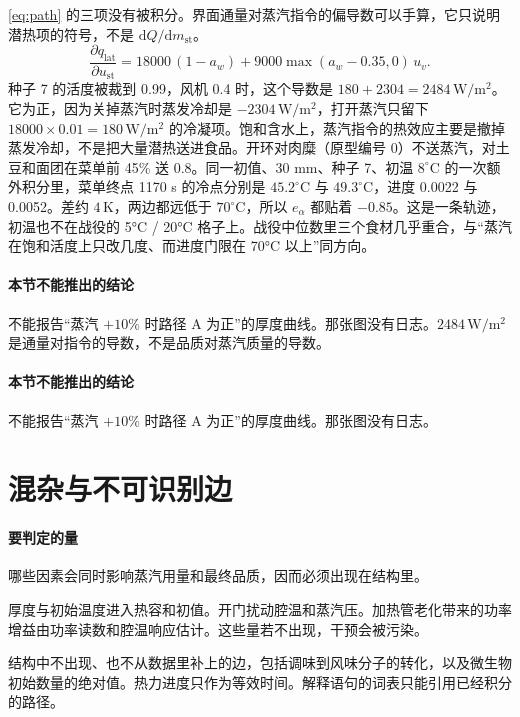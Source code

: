 \eqref{eq:path} 的三项没有被积分。界面通量对蒸汽指令的偏导数可以手算，它只说明潜热项的符号，不是 \(\mathrm{d}Q/\mathrm{d}m_{\mathrm{st}}\)。
\begin{equation}
\label{eq:dqlat}
\frac{\partial q_{\mathrm{lat}}}{\partial u_{\mathrm{st}}}
=18000\,(1-a_w)+9000\max(a_w-0.35,0)\,u_v.
\end{equation}
种子 7 的活度被裁到 0.99，风机 0.4 时，这个导数是 \(180+2304=2484\,\mathrm{W}/\mathrm{m}^2\)。它为正，因为关掉蒸汽时蒸发冷却是 \(-2304\,\mathrm{W}/\mathrm{m}^2\)，打开蒸汽只留下 \(18000\times 0.01=180\,\mathrm{W}/\mathrm{m}^2\) 的冷凝项。饱和含水上，蒸汽指令的热效应主要是撤掉蒸发冷却，不是把大量潜热送进食品。开环对肉糜（原型编号 0）不送蒸汽，对土豆和面团在菜单前 45\% 送 0.8。同一初值、30 mm、种子 7、初温 \(8^\circ\mathrm{C}\) 的一次额外积分里，菜单终点 1170 s 的冷点分别是 \(45.2^\circ\mathrm{C}\) 与 \(49.3^\circ\mathrm{C}\)，进度 0.0022 与 0.0052。差约 \(4\,\mathrm{K}\)，两边都远低于 \(70^\circ\mathrm{C}\)，所以 \(e_{\alpha}\) 都贴着 \(-0.85\)。这是一条轨迹，初温也不在战役的 5°C / 20°C 格子上。战役中位数里三个食材几乎重合，与“蒸汽在饱和活度上只改几度、而进度门限在 70°C 以上”同方向。

\paragraph{本节不能推出的结论}
不能报告“蒸汽 \(+10\%\) 时路径 A 为正”的厚度曲线。那张图没有日志。\(2484\,\mathrm{W}/\mathrm{m}^2\) 是通量对指令的导数，不是品质对蒸汽质量的导数。

\paragraph{本节不能推出的结论}
不能报告“蒸汽 \(+10\%\) 时路径 A 为正”的厚度曲线。那张图没有日志。

\section{混杂与不可识别边}

\paragraph{要判定的量}
哪些因素会同时影响蒸汽用量和最终品质，因而必须出现在结构里。

厚度与初始温度进入热容和初值。开门扰动腔温和蒸汽压。加热管老化带来的功率增益由功率读数和腔温响应估计。这些量若不出现，干预会被污染。

结构中不出现、也不从数据里补上的边，包括调味到风味分子的转化，以及微生物初始数量的绝对值。热力进度只作为等效时间。解释语句的词表只能引用已经积分的路径。

